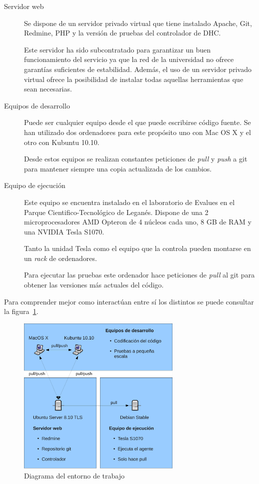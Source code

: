 \begin{description}
	\item[Servidor web] Se dispone de un servidor privado virtual que tiene instalado Apache, Git, Redmine, PHP y la versión de pruebas del controlador de DHC.
	
	Este servidor ha sido subcontratado para garantizar un buen funcionamiento del servicio ya que la red de la universidad no ofrece garantías suficientes de estabilidad. Además, el uso de un servidor privado virtual ofrece la posibilidad de instalar todas aquellas herramientas que sean necesarias.
	
	\item[Equipos de desarrollo] Puede ser cualquier equipo desde el que puede escribirse código fuente. Se han utilizado dos ordenadores para este propósito uno con Mac OS X y el otro con Kubuntu 10.10.
	
	Desde estos equipos se realizan constantes peticiones de \emph{pull} y \emph{push} a git para mantener siempre una copia actualizada de los cambios.
	
	\item[Equipo de ejecución] Este equipo se encuentra instalado en el laboratorio de Evalues en el Parque Cientifico-Tecnológico de Leganés. Dispone de una 2 microprocesadores AMD Opteron de 4 núcleos cada uno, 8 GB de RAM y una NVIDIA Tesla S1070.
	
	Tanto la unidad Tesla como el equipo que la controla pueden montarse en un \emph{rack} de ordenadores.
	
	Para ejecutar las pruebas este ordenador hace peticiones de \emph{pull} al git para obtener las versiones más actuales del código.
\end{description}

Para comprender mejor como interactúan entre sí los distintos se puede consultar la figura~\ref{fig:entorno_trabajo}.

\begin{figure}
	\centering
	\includegraphics[width=0.7\textwidth]{images/entorno_trabajo.pdf}
	\caption{Diagrama del entorno de trabajo}\label{fig:entorno_trabajo}
\end{figure}